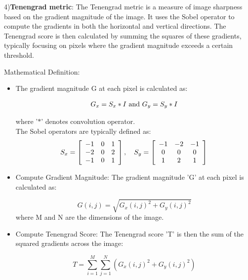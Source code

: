 \documentclass[sn-mathphys]{sn-jnl}%
\theoremstyle{thmstyleone}%
\theoremstyle{thmstyletwo}%
\theoremstyle{thmstylethree}%
\begin{document}
4)\textbf{Tenengrad metric}: The Tenengrad metric \cite{bib13} is a measure of image sharpness based on the gradient magnitude of the image. It uses the Sobel operator to compute the gradients in both the horizontal and vertical directions. The Tenengrad score is then calculated by summing the squares of these gradients, typically focusing on pixels where the gradient magnitude exceeds a certain threshold.\par

Mathematical Definition:\\

\begin{itemize}
  \item The gradient magnitude G at each pixel is calculated as:
  
\begin{equation}
G_x=S_x \ast I \text { and } G_y=S_y \ast I\\
\end{equation}

where '$\ast$'   denotes convolution operator.\\
The Sobel operators are typically defined as:
\begin{equation}
S_x=\left[\begin{array}{lll}
-1 & 0 & 1 \\
-2 & 0 & 2 \\
-1 & 0 & 1
\end{array}\right], \quad S_y=\left[\begin{array}{ccc}
-1 & -2 & -1 \\
0 & 0 & 0 \\
1 & 2 & 1
\end{array}\right]\\
\end{equation}
\item Compute Gradient Magnitude:
The gradient magnitude 'G' at each pixel is calculated as:

\begin{equation}
G(i, j)=\sqrt{G_x(i, j)^2+G_y(i, j)^2}
\end{equation}
where M and N are the dimensions of the image.


\item Compute Tenengrad Score:
The Tenengrad score 'T' is then the sum of the squared gradients across the image:

\begin{equation}
T=\sum_{i=1}^M \sum_{j=1}^N\left(G_x(i, j)^2+G_y(i, j)^2\right)
\end{equation}
\end{itemize}
\end{document}
